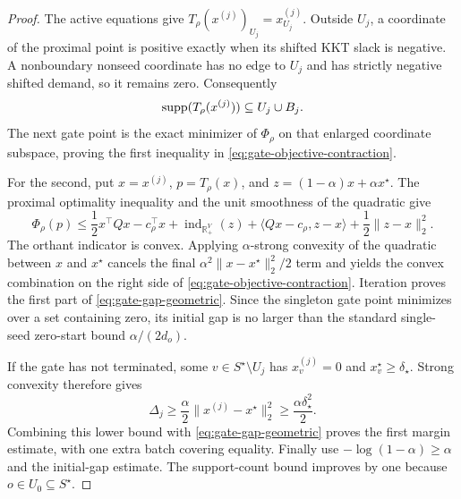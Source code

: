\begin{proof}
The active equations give
$T_\rho(x^{(j)})_{U_j}=x^{(j)}_{U_j}$.  Outside $U_j$, a coordinate of the
proximal point is positive exactly when its shifted KKT slack is negative.
A nonboundary nonseed coordinate has no edge to $U_j$ and has strictly
negative shifted demand, so it remains zero.  Consequently
\begin{equation*}
 \operatorname{supp}(T_\rho(x^{(j)}))\subseteq U_j\cup B_j.
\end{equation*}
The next gate point is the exact minimizer of $\Phi_\rho$ on that enlarged
coordinate subspace, proving the first inequality in
\cref{eq:gate-objective-contraction}.

For the second, put $x=x^{(j)}$, $p=T_\rho(x)$, and
$z=(1-\alpha)x+\alpha x^\star$.  The proximal optimality inequality and the
unit smoothness of the quadratic give
\begin{equation*}
 \Phi_\rho(p)
 \leq
 \frac12x^\top Qx-c_\rho^\top x
 +\operatorname{ind}_{\mathbb R_+^V}(z)
 +\langle Qx-c_\rho,z-x\rangle
 +\frac12\|z-x\|_2^2.
\end{equation*}
The orthant indicator is convex.  Applying $\alpha$-strong convexity of the
quadratic between $x$ and $x^\star$ cancels the final
$\alpha^2\|x-x^\star\|_2^2/2$ term and yields the convex combination on the
right side of \cref{eq:gate-objective-contraction}.  Iteration proves the
first part of \cref{eq:gate-gap-geometric}.  Since the singleton gate point
minimizes over a set containing zero, its initial gap is no larger than the
standard single-seed zero-start bound $\alpha/(2d_o)$.

If the gate has not terminated, some $v\in S^\star\setminus U_j$ has
$x_v^{(j)}=0$ and $x_v^\star\geq\delta_\star$.  Strong convexity therefore
gives
\begin{equation*}
 \Delta_j\geq\frac{\alpha}{2}
 \|x^{(j)}-x^\star\|_2^2
 \geq\frac{\alpha\delta_\star^2}{2}.
\end{equation*}
Combining this lower bound with \cref{eq:gate-gap-geometric} proves the first
margin estimate, with one extra batch covering equality.  Finally use
$-\log(1-\alpha)\geq\alpha$ and the initial-gap estimate.  The support-count
bound improves by one because $o\in U_0\subseteq S^\star$.
\end{proof}


